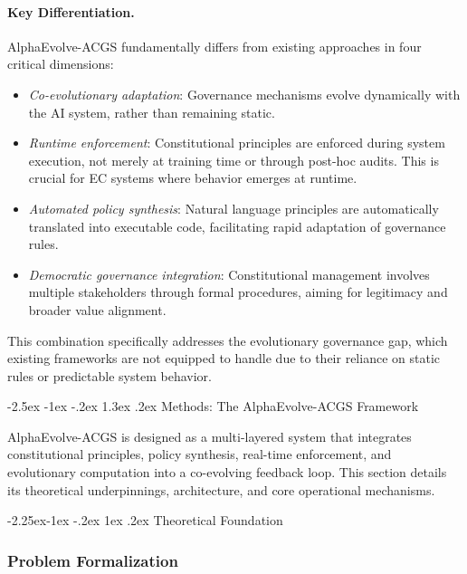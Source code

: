 \documentclass[manuscript,screen,review,anonymous,9pt]{acmart}
\makeatletter
\renewcommand\section{\@startsection{section}{1}{\z@}%
  {-2.5ex \@plus -1ex \@minus -.2ex}%
  {1.3ex \@plus.2ex}%
  {\normalfont\Large\bfseries}}
\renewcommand\subsection{\@startsection{subsection}{2}{\z@}%
  {-2.25ex\@plus -1ex \@minus -.2ex}%
  {1ex \@plus .2ex}%
  {\normalfont\large\bfseries}}
\makeatother
\begin{document}
\paragraph{Key Differentiation.} AlphaEvolve-ACGS fundamentally differs from existing approaches in four critical dimensions:
\begin{itemize}[leftmargin=*,itemsep=1pt,parsep=1pt]
    \item \textit{Co-evolutionary adaptation}: Governance mechanisms evolve dynamically with the AI system, rather than remaining static.
    \item \textit{Runtime enforcement}: Constitutional principles are enforced during system execution, not merely at training time or through post-hoc audits. This is crucial for EC systems where behavior emerges at runtime.
    \item \textit{Automated policy synthesis}: Natural language principles are automatically translated into executable code, facilitating rapid adaptation of governance rules.
    \item \textit{Democratic governance integration}: Constitutional management involves multiple stakeholders through formal procedures, aiming for legitimacy and broader value alignment.
\end{itemize}
This combination specifically addresses the evolutionary governance gap, which existing frameworks are not equipped to handle due to their reliance on static rules or predictable system behavior.

\section{Methods: The AlphaEvolve-ACGS Framework}
\label{sec:methods}

AlphaEvolve-ACGS is designed as a multi-layered system that integrates constitutional principles, policy synthesis, real-time enforcement, and evolutionary computation into a co-evolving feedback loop. This section details its theoretical underpinnings, architecture, and core operational mechanisms.

\subsection{Theoretical Foundation}
\label{subsec:theoretical_foundation}

\subsubsection{Problem Formalization}
\label{subsubsec:problem_formalization}
\end{document}

